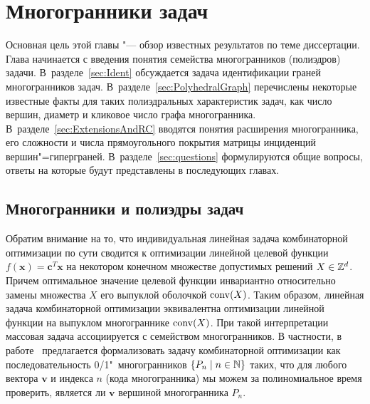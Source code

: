 %
%

\chapter{Многогранники задач}
\label{chap:Polytopes}

Основная цель этой главы "--- обзор известных результатов по теме диссертации.
Глава начинается с введения понятия семейства многогранников (полиэдров) задачи.
В~разделе~\ref{sec:Ident} обсуждается задача идентификации граней многогранников задач. В~разделе~\ref{sec:PolyhedralGraph} перечислены некоторые известные факты для таких полиэдральных характеристик задач, как число вершин, диаметр и кликовое число графа многогранника.
В~разделе~\ref{sec:ExtensionsAndRC} вводятся понятия расширения многогранника, его сложности и числа прямоугольного покрытия матрицы инциденций вершин"=гиперграней. В~разделе~\ref{sec:questions} формулируются общие вопросы, ответы на которые будут представлены в последующих главах.

\section{Многогранники и полиэдры задач}
\label{sec:ProblemPolytopes}

Обратим внимание на то, что индивидуальная линейная задача комбинаторной оптимизации по сути сводится к оптимизации линейной целевой функции $f(\bm{x}) = \bm{c}^T \bm{x}$ на некотором конечном множестве допустимых решений $X \in \mathbb{Z}^d$.
Причем оптимальное значение целевой функции инвариантно относительно замены множества $X$ его выпуклой оболочкой $\operatorname{conv}(X)$.
Таким образом, линейная задача комбинаторной оптимизации эквивалентна оптимизации линейной функции на выпуклом многограннике $\operatorname{conv}(X)$.
При такой интерпретации массовая задача ассоциируется с семейством многогранников.
В частности, в работе~\cite{Papadimitriou:1984}
предлагается формализовать задачу комбинаторной оптимизации как последовательность 0/1"~многогранников $\{P_n \mid n\in\mathbb{N}\}$ таких,
что для любого вектора $\bm{v}$ и индекса $n$ (кода многогранника)
мы можем за полиномиальное время проверить,
является ли $\bm{v}$ вершиной многогранника $P_n$.


